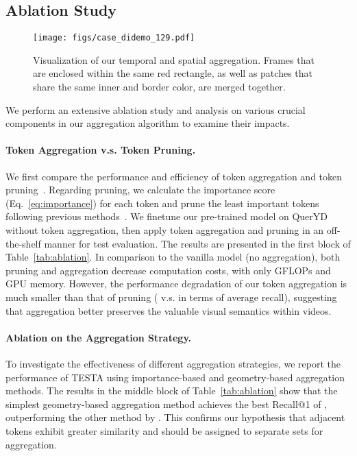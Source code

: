 \documentclass[11pt]{article}
\newcommand{\modelname}{TESTA\xspace}
\begin{document}
\subsection{Ablation Study}

\begin{figure*}[ht]
\centering
\texttt{[image: figs/case\_didemo\_129.pdf]}
\caption{Visualization of our temporal and spatial aggregation. Frames that are enclosed within the same red rectangle, as well as patches that share the same inner and border color, are merged together.}
\label{fig:vis}
\end{figure*}

We perform an extensive ablation study and analysis on various crucial components in our aggregation algorithm to examine their impacts. 

\paragraph{Token Aggregation v.s. Token Pruning.}
We first compare the performance and efficiency of token aggregation and token pruning~\citep{Rao2021DynamicViTEV}. 
Regarding pruning, we calculate the importance score (Eq.~\eqref{eq:importance}) for each token and prune the least important  tokens following previous methods~\cite{Goyal2020PoWERBERTAB}. 
We finetune our pre-trained model on QuerYD without token aggregation, then apply token aggregation and pruning in an off-the-shelf manner for test evaluation. 
The results are presented in the first block of Table~\ref{tab:ablation}. In comparison to the vanilla model (no aggregation), both pruning and aggregation decrease computation costs, with only  GFLOPs and  GPU memory. However, the performance degradation of our token aggregation is much smaller than that of pruning ( v.s.  in terms of average recall), suggesting that aggregation better preserves the valuable visual semantics within videos.

\paragraph{Ablation on the Aggregation Strategy.}
To investigate the effectiveness of different aggregation strategies, we report the performance of \modelname using importance-based and geometry-based aggregation methods. 
The results in the middle block of Table~\ref{tab:ablation} show that the simplest geometry-based aggregation method achieves the best Recall@1 of , outperforming the other method by . 
This confirms our hypothesis that adjacent tokens exhibit greater similarity and should be assigned to separate sets for aggregation. 
\end{document}
